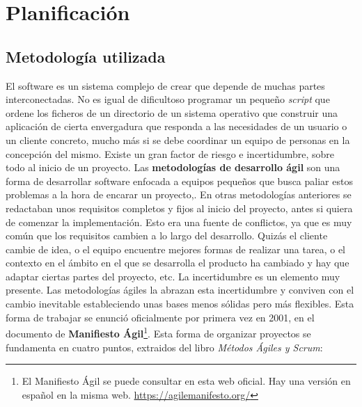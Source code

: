 \chapter{Planificación}

\section{Metodología utilizada}

El software es un sistema complejo de crear que depende de muchas partes interconectadas. No es igual de dificultoso programar un pequeño \textit{script} que ordene los ficheros de un directorio de un sistema operativo que construir una aplicación de cierta envergadura que responda a las necesidades de un usuario o un cliente concreto, mucho más si se debe coordinar un equipo de personas en la concepción del mismo. Existe un gran factor de riesgo e incertidumbre, sobre todo al inicio de un proyecto. Las \textbf{metodologías de desarrollo ágil} son una forma de desarrollar software enfocada a equipos pequeños que busca paliar estos problemas a la hora de encarar un proyecto,. En otras metodologías anteriores se redactaban unos requisitos completos y fijos al inicio del proyecto, antes si quiera de comenzar la implementación. Esto era una fuente de conflictos, ya que es muy común que los requisitos cambien a lo largo del desarrollo. Quizás el cliente cambie de idea, o el equipo encuentre mejores formas de realizar una tarea, o el contexto en el ámbito en el que se desarrolla el producto ha cambiado y hay que adaptar ciertas partes del proyecto, etc. La incertidumbre es un elemento muy presente. Las metodologías ágiles la abrazan esta incertidumbre y conviven con el cambio inevitable estableciendo unas bases menos sólidas pero más flexibles. Esta forma de trabajar se enunció oficialmente por primera vez en 2001, en el documento de \textbf{Manifiesto Ágil}\footnote{El Manifiesto Ágil se puede consultar en esta web oficial. Hay una versión en español en la misma web. \url{https://agilemanifesto.org/}}. Esta forma de organizar proyectos  se fundamenta en cuatro puntos, extraidos del libro \textit{Métodos Ágiles y Scrum}\cite{agilescrum}:


